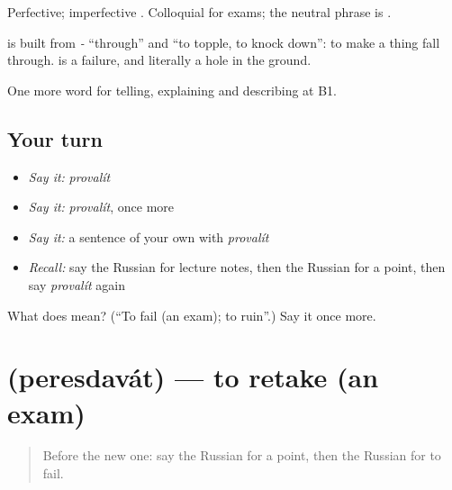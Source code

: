 Perfective; imperfective \emph{}. Colloquial for exams; the neutral phrase is \emph{  }.

\begin{cousinweb}
\textbf{} is built from \emph{-} \textquotedblleft{}through\textquotedblright{} and \emph{} \textquotedblleft{}to topple, to knock down\textquotedblright{}: to make a thing fall through. \emph{} is a failure, and literally a hole in the ground.
\end{cousinweb}

\begin{grammarlens}[title={What you've built}]
One more word for telling, explaining and describing at B1.
\end{grammarlens}

\subsection*{Your turn}
\begin{itemize}
\raggedright
  \item \emph{Say it:} \emph{provalít}
  \item \emph{Say it:} \emph{provalít}, once more
  \item \emph{Say it:} a sentence of your own with \emph{provalít}
  \item \emph{Recall:} say the Russian for lecture notes, then the Russian for a point, then say \emph{provalít} again
\end{itemize}

\begin{tcolorbox}[breakable,colback=teal!4,colframe=teal!35!black,title={Before you move on}]
What does  mean? (\textquotedblleft{}To fail (an exam); to ruin\textquotedblright{}.) Say it once more.
\end{tcolorbox}
\section[\texorpdfstring{\ru{пересдавать} (peresdavát)}{пересдавать (peresdavát)}]{ (peresdavát) — to retake (an exam)}

\label{lesson:RU-C382-peresdavat}



\begin{quote}
Before the new one: say the Russian for a point, then the Russian for to fail.
\end{quote}

